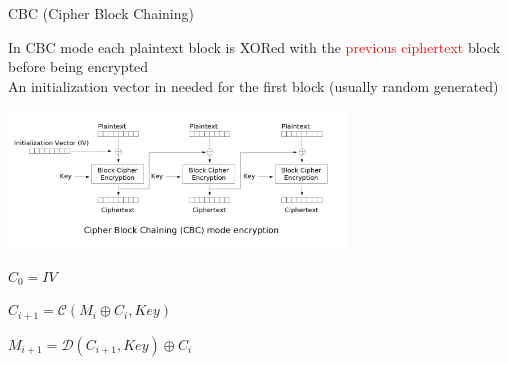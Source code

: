 \begin{frame}{CBC (Cipher Block Chaining)}

In CBC mode each plaintext block is XORed with the \textcolor{red}{previous ciphertext} block before being encrypted \\

An initialization vector in needed for the first block (usually random generated)
 
\medskip

\centerline{\includegraphics[width=9cm]{img/CBC.png}}

\medskip

\phantom{pad}$C_0 = IV$

\phantom{pad}$C_{i+1} = \mathcal{C}(M_i \oplus C_{i}, Key)$

\phantom{pad}$M_{i+1} = \mathcal{D}(C_{i+1}, Key) \oplus C_{i}$
\end{frame}



